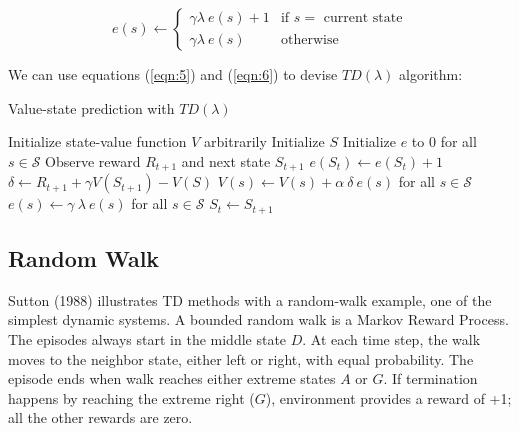 \documentclass{article}
\begin{document}
    \begin{equation}
        e(s) \leftarrow \begin{cases}
                            \gamma \lambda \: e(s) + 1 &\text{if $s =$ current state}\\
                            \gamma \lambda \: e(s) &\text{otherwise}\label{eqn:6}
        \end{cases}
    \end{equation}

    We can use equations (\ref{eqn:5}) and (\ref{eqn:6}) to devise $TD(\lambda)$ algorithm:

    \begin{algorithm}
        \caption{Value-state prediction with $TD(\lambda)$}
        \label{alg:1}
        \begin{algorithmic}
            \STATE Initialize state-value function $V$ arbitrarily
            \STATE Initialize $S$
            \STATE Initialize $e$ to $0$ for all $s \in \mathcal{S}$
            \STATE Observe reward $R_{t+1}$ and next state $S_{t+1}$
            \STATE $e(S_{t}) \gets e(S_{t}) + 1$
            \STATE $\delta \gets R_{t+1} + \gamma V(S_{t+1}) - V(S)$
            \STATE $V(s) \gets V(s) + \alpha \: \delta \: e(s)$ for all $s \in \mathcal{S}$
            \STATE $e(s) \gets \gamma \: \lambda \: e(s)$ for all $s \in \mathcal{S}$
            \STATE $S_{t} \gets S_{t+1}$
            \ENDFOR
            \ENDFOR
        \end{algorithmic}
    \end{algorithm}


    \subsection{Random Walk}
    \label{subsec:randomwalk}

    Sutton (1988) illustrates TD methods with a random-walk example, one of the simplest dynamic systems.
    A bounded random walk is a Markov Reward Process.
    The episodes always start in the middle state $D$.
    At each time step, the walk moves to the neighbor state, either left or right, with equal probability.
    The episode ends when walk reaches either extreme states $A$ or $G$.
    If termination happens by reaching the extreme right ($G$), environment provides a reward of +1;
    all the other rewards are zero.
\end{document}
